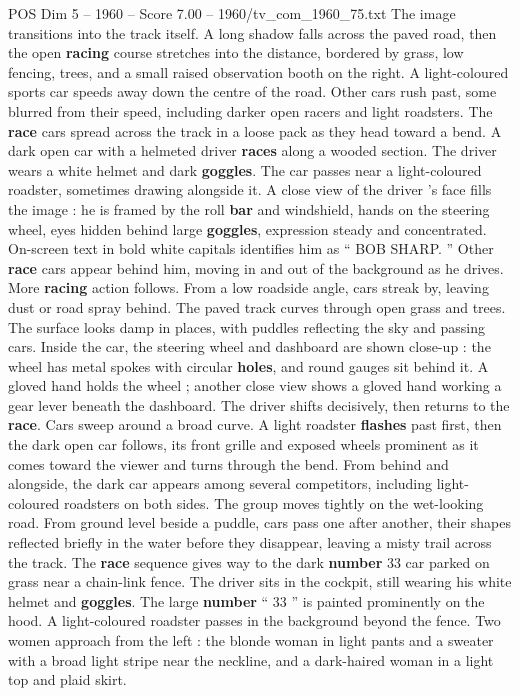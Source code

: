 \begin{textsample}{POS Dim 5 – 1960 – Score 7.00 – 1960/tv\_com\_1960\_75.txt}
The image transitions into the track itself.
A long shadow falls across the paved road, then the open \textbf{racing} course stretches into the distance, bordered by grass, low fencing, trees, and a small raised observation booth on the right.
A light-coloured sports car speeds away down the centre of the road.
Other cars rush past, some blurred from their speed, including darker open racers and light roadsters.
The \textbf{race} cars spread across the track in a loose pack as they head toward a bend.
A dark open car with a helmeted driver \textbf{races} along a wooded section.
The driver wears a white helmet and dark \textbf{goggles}.
The car passes near a light-coloured roadster, sometimes drawing alongside it.
A close view of the driver ’s face fills the image : he is framed by the roll \textbf{bar} and windshield, hands on the steering wheel, eyes hidden behind large \textbf{goggles}, expression steady and concentrated.
On-screen text in bold white capitals identifies him as “ BOB SHARP. ” Other \textbf{race} cars appear behind him, moving in and out of the background as he drives.
More \textbf{racing} action follows.
From a low roadside angle, cars streak by, leaving dust or road spray behind.
The paved track curves through open grass and trees.
The surface looks damp in places, with puddles reflecting the sky and passing cars.
Inside the car, the steering wheel and dashboard are shown close-up : the wheel has metal spokes with circular \textbf{holes}, and round gauges sit behind it.
A gloved hand holds the wheel ; another close view shows a gloved hand working a gear lever beneath the dashboard.
The driver shifts decisively, then returns to the \textbf{race}.
Cars sweep around a broad curve.
A light roadster \textbf{flashes} past first, then the dark open car follows, its front grille and exposed wheels prominent as it comes toward the viewer and turns through the bend.
From behind and alongside, the dark car appears among several competitors, including light-coloured roadsters on both sides.
The group moves tightly on the wet-looking road.
From ground level beside a puddle, cars pass one after another, their shapes reflected briefly in the water before they disappear, leaving a misty trail across the track.
The \textbf{race} sequence gives way to the dark \textbf{number} 33 car parked on grass near a chain-link fence.
The driver sits in the cockpit, still wearing his white helmet and \textbf{goggles}.
The large \textbf{number} “ 33 ” is painted prominently on the hood.
A light-coloured roadster passes in the background beyond the fence.
Two women approach from the left : the blonde woman in light pants and a sweater with a broad light stripe near the neckline, and a dark-haired woman in a light top and plaid skirt.

\end{textsample}
